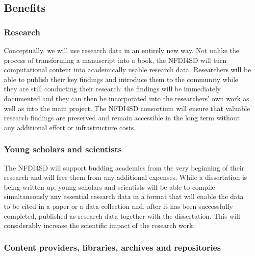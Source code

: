 \documentclass[
  english,
  paper=a4,
  oneside,captions=tableheading
]{scrbook}
\begin{document}
\hypertarget{benefits}{%
\subsection{Benefits}\label{benefits}}

\hypertarget{research}{%
\subsubsection{Research}\label{research}}

Conceptually, we will use research data in an entirely new way. Not
unlike the process of transforming a manuscript into a book, the NFDI4SD
will turn computational content into academically usable research data.
Researchers will be able to publish their key findings and introduce
them to the community while they are still conducting their research:
the findings will be immediately documented and they can then be
incorporated into the researchers' own work as well as into the main
project. The NFDI4SD consortium will ensure that valuable research
findings are preserved and remain accessible in the long term without
any additional effort or infrastructure costs.

\hypertarget{young-scholars-and-scientists}{%
\subsubsection{Young scholars and
scientists}\label{young-scholars-and-scientists}}

The NFDI4SD will support budding academics from the very beginning of
their research and will free them from any additional expenses. While a
dissertation is being written up, young scholars and scientists will be
able to compile simultaneously any essential research data in a format
that will enable the data to be cited in a paper or a data collection
and, after it has been successfully completed, published as research
data together with the dissertation. This will considerably increase the
scientific impact of the research work.

\hypertarget{content-providers-libraries-archives-and-repositories}{%
\subsubsection{Content providers, libraries, archives and
repositories}\label{content-providers-libraries-archives-and-repositories}}
\end{document}
